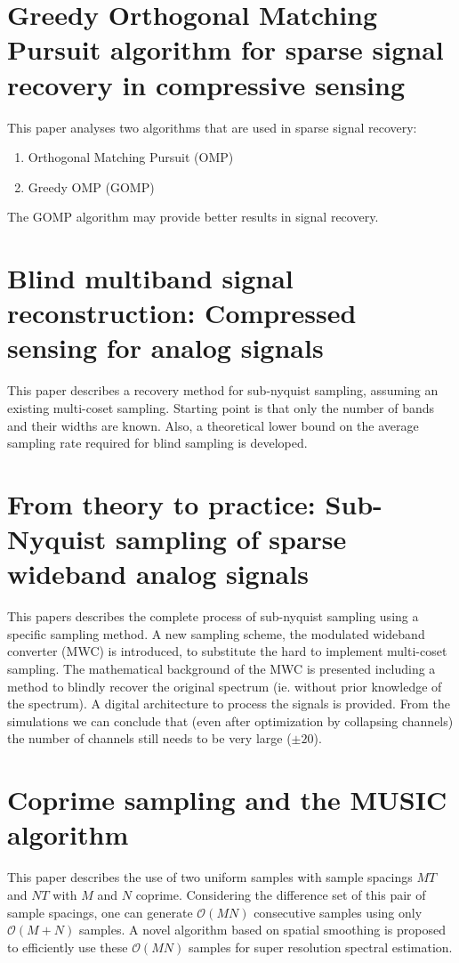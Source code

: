 \documentclass[report, oneside, a4paper, openany]{memoir}
\begin{document}
\section{Greedy Orthogonal Matching Pursuit algorithm for sparse signal recovery in compressive sensing \cite{li2014gomp}}
This paper analyses two algorithms that are used in sparse signal recovery:

\begin{enumerate}
	\item Orthogonal Matching Pursuit (OMP)
	\item Greedy OMP (GOMP)
\end{enumerate}

The GOMP algorithm may provide better results in signal recovery.
\section{Blind multiband signal reconstruction: Compressed sensing for analog signals \cite{mishali2009blind}}
This paper describes a recovery method for sub-nyquist sampling, assuming an existing multi-coset sampling. Starting point is that only the number of bands and their widths are known. Also, a theoretical lower bound on the average sampling rate required for blind sampling is developed.
\section{From theory to practice: Sub-Nyquist sampling of sparse wideband analog signals \cite{mishali2010theory}}
%
This papers describes the complete process of sub-nyquist sampling using a specific sampling method. A new sampling scheme, the modulated wideband converter (MWC) is introduced, to substitute the hard to implement multi-coset sampling. The mathematical background of the MWC is presented including a method to blindly recover the original spectrum (ie. without prior knowledge of the spectrum). A digital architecture to process the signals is provided. From the simulations we can conclude that (even after optimization by collapsing channels) the number of channels  still needs to be very large ($\pm20$).
\section{Coprime sampling and the MUSIC algorithm \cite{pal2011coprime}}
This paper describes the use of two uniform samples with sample
spacings $MT$ and $NT$ with  $M$ and $N$ coprime. Considering the difference set of this pair of sample spacings, one can generate $\mathcal{O}(MN)$ consecutive samples using only $\mathcal{O}(M+N)$ samples. A novel algorithm based on spatial smoothing is proposed to efficiently use these $\mathcal{O}(MN)$ samples for super resolution spectral estimation.
\end{document}
